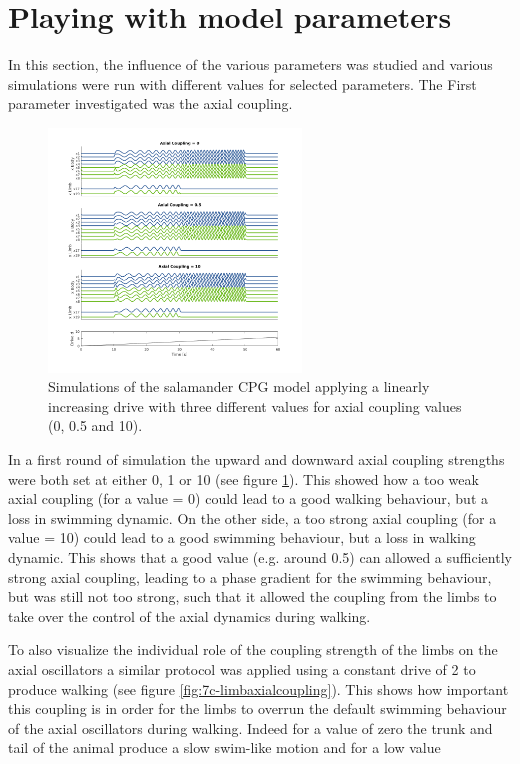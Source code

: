 \documentclass[a4paper]{scrartcl}
\begin{document}
{\section{Playing with model parameters}

In this section, the influence of the various parameters was studied and various simulations were run with different values for selected parameters. The First parameter investigated was the axial coupling. 

\begin{figure}[!h]
	\hspace*{-1 cm}
	\includegraphics[width=0.6\textwidth]{fig/figure7c_axial-coupling.png}
	\caption{Simulations of the salamander CPG model applying a linearly increasing drive with three different values for axial coupling values (0, 0.5 and 10).}
	\label{fig:7c-axialcoupling}
\end{figure}

{\setlength{\parindent}{0 cm}
In a first round of simulation the upward and downward axial coupling strengths were both set at either 0, 1 or 10 (see figure \ref{fig:7c-axialcoupling}). This showed how a too weak axial coupling (for a value = 0) could lead to a good walking behaviour, but a loss in swimming dynamic. On the other side, a too strong axial coupling (for a value = 10) could lead to a good swimming behaviour, but a loss in walking dynamic. This shows that a good value (e.g. around 0.5) can allowed a sufficiently strong axial coupling, leading to a phase gradient for the swimming behaviour, but was still not too strong, such that it allowed the coupling from the limbs to take over the control of the axial dynamics during walking.
}

To also visualize the individual role of the coupling strength of the limbs on the axial oscillators a similar protocol was applied using a constant drive of 2 to produce walking (see figure \ref{fig:7c-limbaxialcoupling}). This shows how important this coupling is in order for the limbs to overrun the default swimming behaviour of the axial oscillators during walking. Indeed for a value of zero the trunk and tail of the animal produce a slow swim-like motion and for a low value

}
\end{document}
